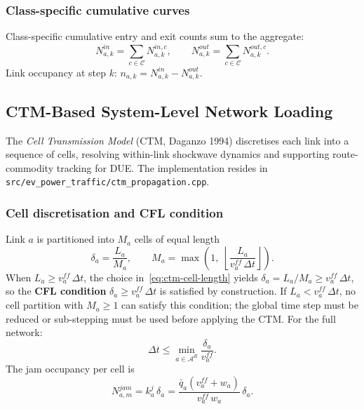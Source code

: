 \subsubsection{Class-specific cumulative curves}

Class-specific cumulative entry and exit counts sum to the aggregate:
\begin{equation}
  N^{in}_{a,k} = \sum_{c \in \mathcal{C}} N^{in,c}_{a,k}, \qquad
  N^{out}_{a,k} = \sum_{c \in \mathcal{C}} N^{out,c}_{a,k}.
  \label{eq:class-cumulative}
\end{equation}
Link occupancy at step $k$: $n_{a,k} = N^{in}_{a,k} - N^{out}_{a,k}$.

\subsection{CTM-Based System-Level Network Loading}
\label{sec:traffic-ctm}

The \emph{Cell Transmission Model} (CTM, Daganzo 1994) discretises each
link into a sequence of cells, resolving within-link shockwave dynamics and
supporting route-commodity tracking for DUE.
The implementation resides in \texttt{src/ev\_power\_traffic/ctm\_propagation.cpp}.

\subsubsection{Cell discretisation and CFL condition}

Link $a$ is partitioned into $M_a$ cells of equal length
\begin{equation}
  \delta_a = \frac{L_a}{M_a}, \qquad
  M_a = \max\!\left(1,\;\left\lfloor \frac{L_a}{v^{ff}_a\,\Delta t} \right\rfloor\right).
  \label{eq:ctm-cell-length}
\end{equation}
When $L_a \ge v^{ff}_a\,\Delta t$, the choice in~\eqref{eq:ctm-cell-length}
yields $\delta_a = L_a/M_a \ge v^{ff}_a\,\Delta t$, so the
\textbf{CFL condition} $\delta_a \ge v^{ff}_a\,\Delta t$ is satisfied by
construction.  If $L_a < v^{ff}_a\,\Delta t$, no cell partition with
$M_a \ge 1$ can satisfy this condition; the global time step must be
reduced or sub-stepping must be used before applying the CTM.
For the full network:
\begin{equation}
  \Delta t \le \min_{a \in \mathcal{A}^R} \frac{\delta_a}{v^{ff}_a}.
  \label{eq:ctm-global-cfl}
\end{equation}
The jam occupancy per cell is
\begin{equation}
  N^{jam}_{a,m} = k^j_a\,\delta_a
    = \frac{\bar{q}_a(v^{ff}_a + w_a)}{v^{ff}_a\,w_a}\,\delta_a.
  \label{eq:ctm-njam-cell}
\end{equation}

